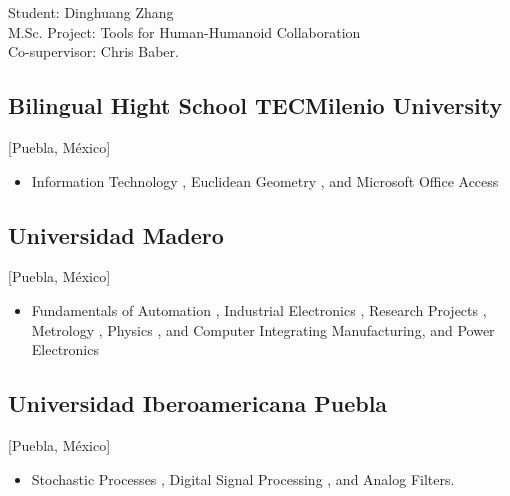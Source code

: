 \documentclass{mycv}
\begin{document}
\begin{positions}
\end{positions}
Student: Dinghuang Zhang \\
M.Sc. Project: Tools for Human-Humanoid Collaboration \\
Co-supervisor: Chris Baber. 

\subsection{Bilingual Hight School TECMilenio University}[Puebla, M\'exico]
\begin{positions}
\end{positions}
\begin{itemize}
	\item
	Information Technology \href{https://sites.google.com/site/perezxochicale/teaching/iit}{\faExternalLink}, 
	Euclidean Geometry  \href{https://sites.google.com/site/perezxochicale/teaching/euclidean-geometry}{\faExternalLink}, and 
	Microsoft Office Access \href{https://sites.google.com/site/perezxochicale/teaching/moa}{\faExternalLink}
\end{itemize}

\subsection{Universidad Madero}[Puebla, M\'exico]
\begin{positions}
\end{positions}
\begin{itemize}
	\item Fundamentals of Automation \href{https://sites.google.com/site/perezxochicale/digital-electronics}{\faExternalLink}, 
	Industrial Electronics \href{https://sites.google.com/site/perezxochicale/ie}{\faExternalLink},
	Research Projects \href{https://sites.google.com/site/perezxochicale/latex/thesistemplate}{\faExternalLink},
	Metrology \href{https://sites.google.com/site/perezxochicale/metrology}{\faExternalLink},
	Physics \href{http://goo.gl/fffnG}{\faExternalLink}, and 
	Computer Integrating Manufacturing, and Power Electronics
\end{itemize}

\subsection{Universidad Iberoamericana Puebla}[Puebla, M\'exico]
\begin{positions}
\end{positions}
\begin{itemize}
	\item Stochastic Processes \href{https://sites.google.com/site/perezxochicale/stochastic-processes-course}{\faExternalLink}, 
	Digital Signal Processing \href{https://sites.google.com/site/perezxochicale/digital-signal-processing-course}{\faExternalLink}, 
	and Analog Filters.
\end{itemize}
\end{document}

